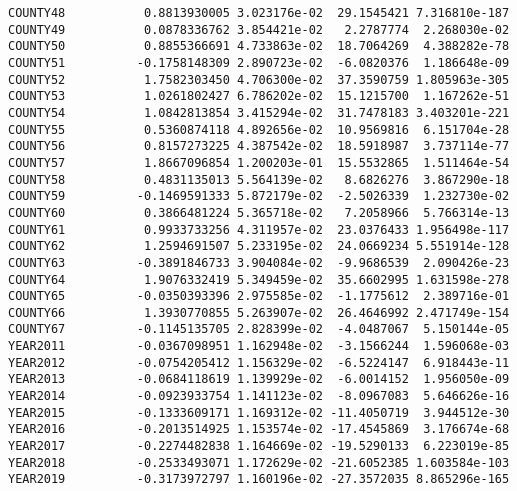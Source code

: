 \documentclass[
  letterpaper,
  DIV=11,
  numbers=noendperiod]{scrartcl}
\newenvironment{Shaded}{\begin{snugshade}}{\end{snugshade}}
\newcommand{\FunctionTok}[1]{\textcolor[rgb]{0.28,0.35,0.67}{#1}}
\newcommand{\NormalTok}[1]{\textcolor[rgb]{0.00,0.23,0.31}{#1}}
\newcommand{\SpecialCharTok}[1]{\textcolor[rgb]{0.37,0.37,0.37}{#1}}
\begin{document}
\begin{verbatim}
COUNTY48           0.8813930005 3.023176e-02  29.1545421 7.316810e-187
COUNTY49           0.0878336762 3.854421e-02   2.2787774  2.268030e-02
COUNTY50           0.8855366691 4.733863e-02  18.7064269  4.388282e-78
COUNTY51          -0.1758148309 2.890723e-02  -6.0820376  1.186648e-09
COUNTY52           1.7582303450 4.706300e-02  37.3590759 1.805963e-305
COUNTY53           1.0261802427 6.786202e-02  15.1215700  1.167262e-51
COUNTY54           1.0842813854 3.415294e-02  31.7478183 3.403201e-221
COUNTY55           0.5360874118 4.892656e-02  10.9569816  6.151704e-28
COUNTY56           0.8157273225 4.387542e-02  18.5918987  3.737114e-77
COUNTY57           1.8667096854 1.200203e-01  15.5532865  1.511464e-54
COUNTY58           0.4831135013 5.564139e-02   8.6826276  3.867290e-18
COUNTY59          -0.1469591333 5.872179e-02  -2.5026339  1.232730e-02
COUNTY60           0.3866481224 5.365718e-02   7.2058966  5.766314e-13
COUNTY61           0.9933733256 4.311957e-02  23.0376433 1.956498e-117
COUNTY62           1.2594691507 5.233195e-02  24.0669234 5.551914e-128
COUNTY63          -0.3891846733 3.904084e-02  -9.9686539  2.090426e-23
COUNTY64           1.9076332419 5.349459e-02  35.6602995 1.631598e-278
COUNTY65          -0.0350393396 2.975585e-02  -1.1775612  2.389716e-01
COUNTY66           1.3930770855 5.263907e-02  26.4646992 2.471749e-154
COUNTY67          -0.1145135705 2.828399e-02  -4.0487067  5.150144e-05
YEAR2011          -0.0367098951 1.162948e-02  -3.1566244  1.596068e-03
YEAR2012          -0.0754205412 1.156329e-02  -6.5224147  6.918443e-11
YEAR2013          -0.0684118619 1.139929e-02  -6.0014152  1.956050e-09
YEAR2014          -0.0923933754 1.141123e-02  -8.0967083  5.646626e-16
YEAR2015          -0.1333609171 1.169312e-02 -11.4050719  3.944512e-30
YEAR2016          -0.2013514925 1.153574e-02 -17.4545869  3.176674e-68
YEAR2017          -0.2274482838 1.164669e-02 -19.5290133  6.223019e-85
YEAR2018          -0.2533493071 1.172629e-02 -21.6052385 1.603584e-103
YEAR2019          -0.3173972797 1.160196e-02 -27.3572035 8.865296e-165
\end{verbatim}

\begin{Shaded}
\end{Shaded}
\end{document}
